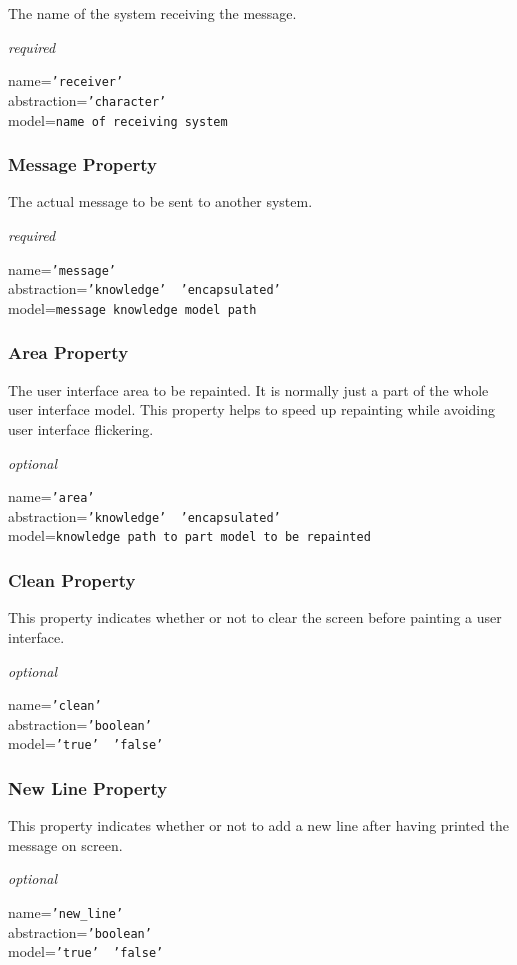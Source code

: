 The name of the system receiving the message.

\emph{required}

name=\texttt{'receiver'}\\
abstraction=\texttt{'character'}\\
model=\texttt{name of receiving system}

\subsubsection{Message Property}

The actual message to be sent to another system.

\emph{required}

name=\texttt{'message'}\\
abstraction=\texttt{'knowledge' \vline\ 'encapsulated'}\\
model=\texttt{message knowledge model path}

\subsubsection{Area Property}

The user interface area to be repainted. It is normally just a part of the
whole user interface model. This property helps to speed up repainting while
avoiding user interface flickering.

\emph{optional}

name=\texttt{'area'}\\
abstraction=\texttt{'knowledge' \vline\ 'encapsulated'}\\
model=\texttt{knowledge path to part model to be repainted}

\subsubsection{Clean Property}

This property indicates whether or not to clear the screen before painting a
user interface.

\emph{optional}

name=\texttt{'clean'}\\
abstraction=\texttt{'boolean'}\\
model=\texttt{'true' \vline\ 'false'}

\subsubsection{New Line Property}

This property indicates whether or not to add a new line after having printed
the message on screen.

\emph{optional}

name=\texttt{'new\_line'}\\
abstraction=\texttt{'boolean'}\\
model=\texttt{'true' \vline\ 'false'}
